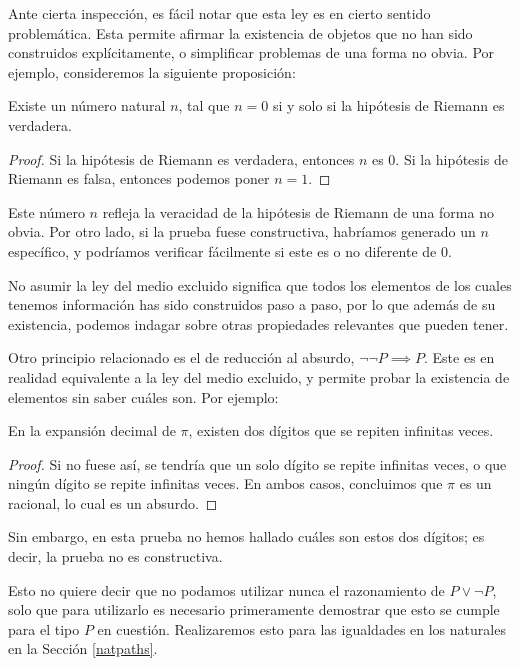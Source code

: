 \documentclass[../main.tex]{subfiles}
\begin{document}
Ante cierta inspecci\'on, es f\'acil notar que esta ley es en cierto sentido problem\'atica.
Esta permite afirmar la existencia de objetos que no han sido construidos expl\'icitamente, o simplificar problemas de una forma no obvia. Por ejemplo, consideremos la siguiente proposici\'on:

\begin{proposition}
    Existe un n\'umero natural $n$, tal que $n=0$ si y solo si la hipótesis de Riemann es verdadera.
\end{proposition}

\begin{proof}
    Si la hip\'otesis de Riemann es verdadera, entonces $n$ es 0. Si la hipótesis de Riemann es falsa, entonces podemos poner $n=1$.
\end{proof}

Este n\'umero $n$ refleja la veracidad de la hip\'otesis de Riemann de una forma no obvia.
Por otro lado, si la prueba fuese constructiva, habr\'iamos generado un $n$ espec\'ifico, y podr\'iamos verificar f\'acilmente si este es o no diferente de 0.

No asumir la ley del medio excluido significa que todos los elementos de los cuales tenemos informaci\'on has sido construidos paso a paso, por lo que adem\'as de su existencia, podemos indagar sobre otras propiedades relevantes que pueden tener.

Otro principio relacionado es el de reducci\'on al absurdo, $\neg \neg P \implies P$.
Este es en realidad equivalente a la ley del medio excluido, y permite probar la existencia de elementos sin saber cu\'ales son. Por ejemplo:

\begin{proposition}
    En la expansi\'on decimal de $\pi$, existen dos d\'igitos que se repiten infinitas veces.
\end{proposition}

\begin{proof}
    Si no fuese as\'i, se tendr\'ia que un solo d\'igito se repite infinitas veces, o que ning\'un d\'igito se repite infinitas veces. En ambos casos, concluimos que $\pi$ es un racional, lo cual es un absurdo.
\end{proof}

Sin embargo, en esta prueba no hemos hallado cu\'ales son estos dos d\'igitos; es decir, la prueba no es constructiva.

Esto no quiere decir que no podamos utilizar nunca el razonamiento de $P \vee \lnot P$, solo que para utilizarlo es necesario primeramente demostrar que esto se cumple para el tipo $P$ en cuesti\'on. Realizaremos esto para las igualdades en los naturales en la Secci\'on \ref{natpaths}.
\end{document}
